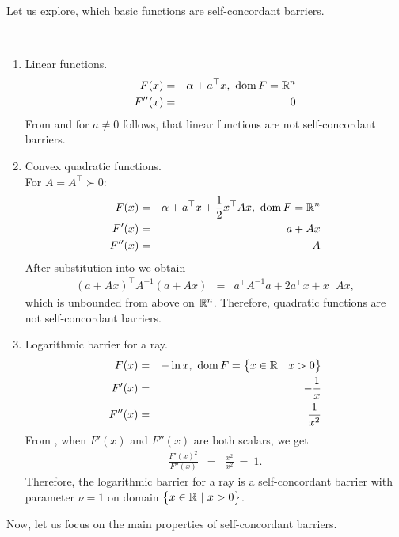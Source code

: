 Let us explore, which basic functions are self-concordant barriers.

\begin{example}~
  \begin{enumerate}
    \item Linear functions.
      \begin{eqnarray}
        F(x) &=& \alpha + a^\top x,\ \operatorname{dom} F = \mathbb{R}^n\\
        F''(x) &=& 0
      \end{eqnarray}
      From  and for $a \neq 0$ follows, that linear functions are not self-concordant barriers.

    \item Convex quadratic functions.\\
      For $A = A^\top \succ 0$:
      \begin{eqnarray}
        F(x) &=& \alpha + a^\top x + \frac{1}{2} x^\top Ax,\ \dom F = \R^n\\
        F'(x) &=& a + Ax\\
        F''(x) &=& A
      \end{eqnarray}
      After substitution into  we obtain
      \begin{eqnarray}
        (a + Ax)^\top A^{-1}(a + Ax) &=& a^\top A^{-1}a + 2a^\top x + x^\top Ax,
      \end{eqnarray}
      which is unbounded from above on $\mathbb{R}^n$. Therefore, quadratic functions are not self-concordant barriers.
      

    \item Logarithmic barrier for a ray.
      \begin{eqnarray}
        F(x) &=& -\ln x,\ \operatorname{dom} F = \big\{x\in\mathbb{R}\ |\ x > 0\big\}\\
        F'(x) &=& -\frac{1}{x}\\
        F''(x) &=& \frac{1}{x^2}
      \end{eqnarray}
      From , when $F'(x)$ and $F''(x)$ are both scalars, we get
      \begin{eqnarray}
        \frac{F'(x)^2}{F''(x)} &=& \frac{x^2}{x^2}\ =\ 1.
      \end{eqnarray}
      Therefore, the logarithmic barrier for a ray is a self-concordant barrier with parameter $\nu = 1$ on domain $\big\{x\in\mathbb{R}\ |\ x > 0\big\}$.
  \end{enumerate}
\end{example}

Now, let us focus on the main properties of self-concordant barriers.

